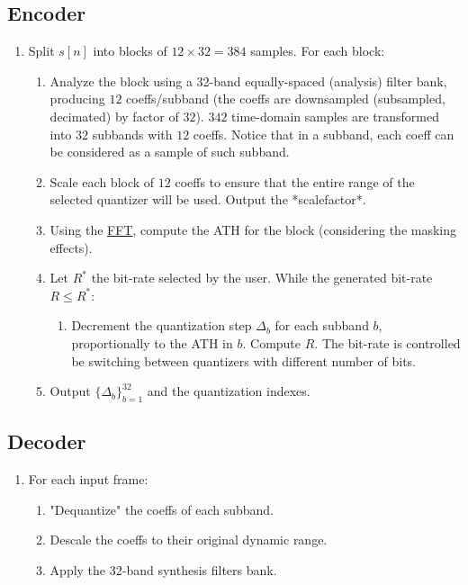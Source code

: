 \subsection{Encoder}
\begin{enumerate}
\item Split $s[n]$ into blocks of $12\times 32=384$ samples. For each
  block:
  \begin{enumerate}
   \item Analyze the block using a 32-band equally-spaced (analysis)
     filter bank, producing $12$ coeffs/subband (the coeffs are
     downsampled (subsampled, decimated) by factor of $32$). $342$
     time-domain samples are transformed into $32$ subbands with $12$
     coeffs. Notice that in a subband, each coeff can be considered as
     a sample of such subband.
   \item Scale each block of $12$ coeffs to ensure that the entire
     range of the selected quantizer will be used. Output the
     *scalefactor*.
   \item Using the
     \href{https://en.wikipedia.org/wiki/Fast_Fourier_transform}{FFT},
     compute the ATH for the block (considering the masking effects).
   \item Let $R^*$ the bit-rate selected by the user. While the
     generated bit-rate $R\leq R^*$:
     \begin{enumerate}
     \item Decrement the quantization step $\Delta_b$ for each subband
       $b$, proportionally to the ATH in $b$. Compute $R$. The
       bit-rate is controlled be switching between quantizers with
       different number of bits.
     \end{enumerate}
   \item Output $\{\Delta_b\}_{b=1}^{32}$ and the quantization
     indexes.
  \end{enumerate}
\end{enumerate}

\subsection{Decoder}
\begin{enumerate}
\item For each input frame:
  \begin{enumerate}
   \item "Dequantize" the coeffs of each subband.
   \item Descale the coeffs to their original dynamic range.
   \item Apply the 32-band synthesis filters bank.
  \end{enumerate}
\end{enumerate}


